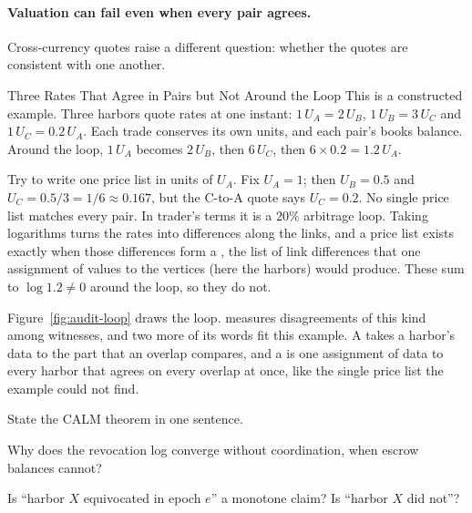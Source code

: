 \documentclass[11pt,a4paper]{article}
\theoremstyle{definition}
\theoremstyle{definition}
\theoremstyle{remark}
\begin{document}
\paragraph{Valuation can fail even when every pair agrees.} Cross-currency
quotes raise a different question: whether the quotes are consistent with one
another.

\begin{pdexample}{Three Rates That Agree in Pairs but Not Around the Loop}
\setlength{\parskip}{4pt plus 1pt}
This is a constructed example. Three harbors quote rates at one instant:
$1\,U_A=2\,U_B$, $1\,U_B=3\,U_C$ and $1\,U_C=0.2\,U_A$. Each trade conserves
its own units, and each pair's books balance. Around the loop, $1\,U_A$
becomes $2\,U_B$, then $6\,U_C$, then $6\times0.2=1.2\,U_A$.

Try to write one price list in units of $U_A$. Fix $U_A=1$; then $U_B=0.5$
and $U_C=0.5/3=1/6\approx0.167$, but the C-to-A quote says $U_C=0.2$. No
single price list matches every pair. In trader's terms it is a $20\%$
arbitrage loop. Taking logarithms turns the rates into differences along the
links, and a price list exists exactly when those differences form a
, the list of link differences that one assignment of
values to the vertices (here the harbors) would produce. These sum to
$\log 1.2\ne0$ around the loop, so they do not.
\end{pdexample}

Figure~\ref{fig:audit-loop} draws the loop.  measures disagreements of this kind among witnesses, and two more of
its words fit this example. A  takes
a harbor's data to the part that an overlap compares, and a
 is one assignment of data to every harbor that agrees
on every overlap at once, like the single price list the example could not
find.



\pdexercisepointer*{\ref{ex:he-calm-union}}{\ref{ex:he-calm-gset-model}}{\pageref{ex:he-calm-union}}

\begin{pdrecitation}
\item State the CALM theorem in one sentence.
\item Why does the revocation log converge without coordination, when escrow balances cannot?
\item Is ``harbor $X$ equivocated in epoch $e$'' a monotone claim? Is ``harbor $X$ did not''?
\end{pdrecitation}
\end{document}
